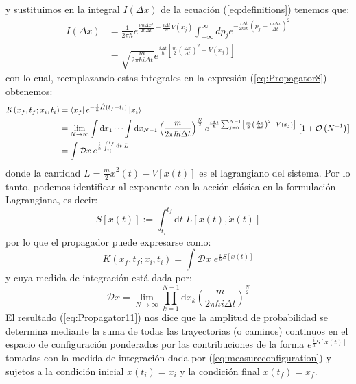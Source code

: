 \documentclass[11pt,a4paper]{article}
\begin{document}
y sustituimos en la integral $I(\Delta x)$ de la ecuaci\'on (\ref{eq:definitions}) tenemos que:
\begin{equation}
\begin{split}
I(\Delta x) & = \frac{1}{2\pi\hbar}e^{\frac{im\Delta x^2}{2\hbar\Delta t}- \frac{i\Delta t}{\hbar} V(x_j)}\int_{-\infty}^{\infty} dp_j e^{-\frac{i\Delta t}{2m\hbar}\left( p_j - \frac{m\Delta x}{\Delta t}\right)^2} \\
& = \sqrt{\frac{m}{2\pi\hbar i \Delta t}}e^{\frac{i\Delta t}{\hbar}\left[ \frac{m}{2}\left( \frac{\Delta x}{\Delta t} \right)^2 - V(x_j) \right]}
\end{split}
\label{eq:integral}
\end{equation}
con lo cual, reemplazando estas integrales en la expresi\'on (\ref{eq:Propagator8}) obtenemos:
\begin{equation}
\begin{split}
K(x_f,t_f; x_i,t_i) & = \bra{x_f}e^{-\frac{i}{\hbar}\hat{H} (t_f - t_i)}\ket{x_i} \\
& = \lim_{N\rightarrow \infty}\int \mathrm{d}x_1 \cdots \int \mathrm{d}x_{N-1} \left( \frac{m}{2\pi\hbar i \Delta t} \right)^{\frac{N}{2}} e^{\frac{i\Delta t}{\hbar}\sum_{j=0}^{N-1}\left[ \frac{m}{2}\left( \frac{\Delta x}{\Delta t} \right)^2 - V(x_j) \right]} \left[ 1 + \mathcal{O} \left( N^{-1} \right) \right]  \\
& = \int\mathcal{D}x \; e^{\frac{i}{\hbar}\int_{t_i}^{t_f}\mathrm{d}t \; L}
\end{split}
\label{eq:Propagator10}
\end{equation}
donde la cantidad $L = \frac{m}{2}\dot{x}^2(t) - V\left[x(t)\right]$ es el lagrangiano del sistema. Por lo tanto, podemos identificar al exponente con la acci\'on cl\'asica en la formulaci\'on Lagrangiana, es decir:
\begin{equation}
S\left[ x(t) \right] := \int_{t_i}^{t_f}\mathrm{d}t \; L\left[ x(t), \dot{x}(t) \right]
\label{eq:actionlagrangian}
\end{equation}
por lo que el propagador puede expresarse como:
\begin{equation}
K(x_f,t_f; x_i,t_i) = \int\mathcal{D}x \; e^{\frac{i}{\hbar}S\left[ x(t) \right]}
\label{eq:Propagator11}
\end{equation}
y cuya medida de integraci\'on est\'a dada por:
\begin{equation}
\mathcal{D}x = \lim_{N \rightarrow \infty} \prod_{k=1}^{N-1}\mathrm{d}x_k\left( \frac{m}{2\pi\hbar i \Delta t} \right)^{\frac{N}{2}}
\label{eq:measureconfiguration}
\end{equation}
El resultado (\ref{eq:Propagator11}) nos dice que la amplitud de probabilidad se determina mediante la suma de todas las trayectorias (o caminos) continuos en el espacio de configuraci\'on ponderados por las contribuciones de la forma $e^{\frac{i}{\hbar}S\left[ x(t) \right]}$ tomadas con la medida de integraci\'on dada por (\ref{eq:measureconfiguration}) y sujetos a la condici\'on inicial $x(t_i) = x_i$ y la condición final $x(t_f) = x_f$.\\
\end{document}
